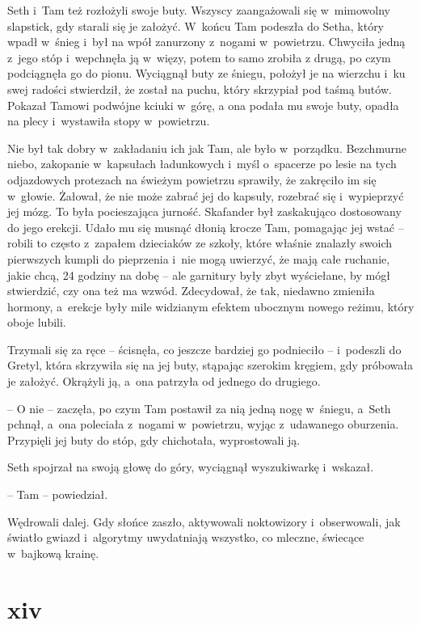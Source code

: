 \documentclass[oneside,polish,11pt,sfheadings]{mwbk}
\begin{document}
Seth i~Tam też rozłożyli swoje buty. Wszyscy zaangażowali się w~mimowolny slapstick, gdy starali się je założyć. W~końcu Tam podeszła do
Setha, który wpadł w~śnieg i~był na wpół zanurzony z~nogami w~powietrzu.
Chwyciła jedną z~jego stóp i~wepchnęła ją w~więzy, potem to samo zrobiła
z drugą, po czym podciągnęła go do pionu. Wyciągnął buty ze śniegu,
położył je na wierzchu i~ku swej radości stwierdził, że został na puchu,
który skrzypiał pod taśmą butów. Pokazał Tamowi podwójne kciuki w~górę,
a ona podała mu swoje buty, opadła na plecy i~wystawiła stopy w~powietrzu.

Nie był tak dobry w~zakładaniu ich jak Tam, ale było w~porządku.
Bezchmurne niebo, zakopanie w~kapsułach ładunkowych i~myśl o~spacerze po
lesie na tych odjazdowych protezach na świeżym powietrzu sprawiły, że
zakręciło im się w~głowie. Żałował, że nie może zabrać jej do kapsuły,
rozebrać się i~wypieprzyć jej mózg. To była pocieszająca jurność.
Skafander był zaskakująco dostosowany do jego erekcji. Udało mu się
musnąć dłonią krocze Tam, pomagając jej wstać -- robili to często z~zapałem dzieciaków ze szkoły, które właśnie znalazły swoich pierwszych
kumpli do pieprzenia i~nie mogą uwierzyć, że mają całe ruchanie, jakie
chcą, 24 godziny na dobę -- ale garnitury były zbyt wyściełane, by mógł
stwierdzić, czy ona też ma wzwód. Zdecydował, że tak, niedawno zmieniła
hormony, a~erekcje były mile widzianym efektem ubocznym nowego reżimu,
który oboje lubili.

Trzymali się za ręce -- ścisnęła, co jeszcze bardziej go podnieciło -- i~podeszli do Gretyl, która skrzywiła się na jej buty, stąpając szerokim
kręgiem, gdy próbowała je założyć. Okrążyli ją, a~ona patrzyła od
jednego do drugiego.

-- O nie -- zaczęła, po czym Tam postawił za nią jedną nogę w~śniegu, a~Seth pchnął, a~ona poleciała z~nogami w~powietrzu, wyjąc z~udawanego
oburzenia. Przypięli jej buty do stóp, gdy chichotała, wyprostowali ją.

Seth spojrzał na swoją głowę do góry, wyciągnął wyszukiwarkę i~wskazał.

-- Tam -- powiedział.

Wędrowali dalej. Gdy słońce zaszło, aktywowali noktowizory i~obserwowali, jak światło gwiazd i~algorytmy uwydatniają wszystko, co
mleczne, świecące w~bajkową krainę.

\chapter*{xiv}
\end{document}
